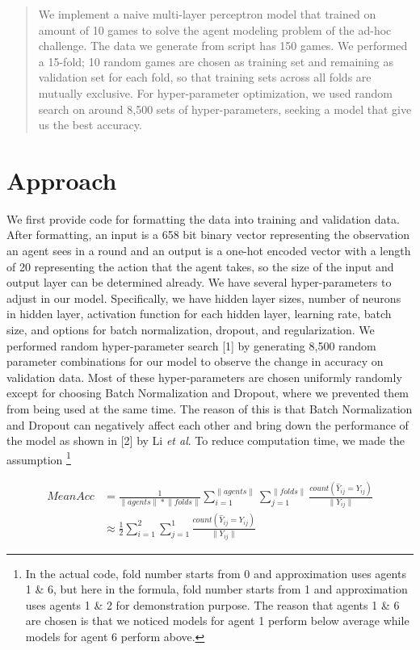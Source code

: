 \documentclass[10pt]{article}
\begin{document}
\normalsize

\begin{abstract}
	\quad We implement a naive multi-layer perceptron model that trained on amount of 10 games to solve the agent modeling problem of the ad-hoc challenge. The data we generate from script has 150 games. We performed a 15-fold; 10 random games are chosen as training set and remaining as validation set for each fold, so that training sets across all folds are mutually exclusive. For hyper-parameter optimization, we used random search on around 8,500 sets of hyper-parameters, seeking a model that give us the best accuracy.
\end{abstract}

\section{Approach}
	\quad We first provide code for formatting the data into training and validation data. After formatting, an input is a 658 bit binary vector representing the observation an agent sees in a round and an output is a one-hot encoded vector with a length of 20 representing the action that the agent takes, so the size of the input and output layer can be determined already. We have several hyper-parameters to adjust in our model. Specifically, we have hidden layer sizes, number of neurons in hidden layer, activation function for each hidden layer, learning rate, batch size, and options for batch normalization, dropout, and regularization. We performed random hyper-parameter search [1] by generating 8,500 random parameter combinations for our model to observe the change in accuracy on validation data. Most of these hyper-parameters are chosen uniformly randomly except for choosing Batch Normalization and Dropout, where we prevented them from being used at the same time. The reason of this is that Batch Normalization and Dropout can negatively affect each other and bring down the performance of the model as shown in [2] by Li \textit{et al}. To reduce computation time, we made the assumption \footnote{In the actual code, fold number starts from 0 and approximation uses agents 1 \& 6, but here in the formula, fold number starts from 1 and approximation uses agents 1 \& 2 for demonstration purpose. The reason that agents 1 \& 6 are chosen is that we noticed models for agent 1 perform below average while models for agent 6 perform above.}

  \begin{align*}
    Mean Acc &=
    \frac{1}{\lVert agents\rVert*\lVert folds\rVert}\sum_{i=1}^{\lVert agents\rVert}\sum_{j=1}^{\lVert folds\rVert} \frac{count(\hat{Y}_{ij}=Y_{ij})}{\lVert Y_{ij} \rVert}\\
    &\approx
    \frac{1}{2}
    \sum_{i=1}^{2}\sum_{j=1}^{1} \frac{count(\hat{Y}_{ij}=Y_{ij})}{\lVert Y_{ij} \rVert}
  \end{align*}
\end{document}
